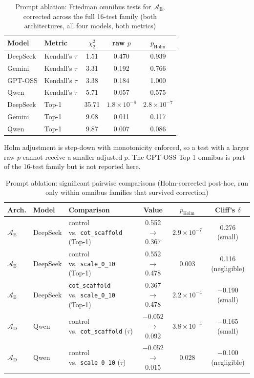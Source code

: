 \documentclass[11pt]{article}
\begin{document}
\begin{table}[htbp]
\centering
\small
\centering
\renewcommand{\arraystretch}{1.10}
\caption{Prompt ablation: Friedman omnibus tests for $\mathcal{A}_{\text{E}}$, corrected across the full 16-test family (both architectures, all four models, both metrics)}
\label{tab:prompt_friedman}
\begin{tabular}{@{}ll ccc@{}}
\toprule
Model & Metric & $\chi^2_2$ & raw $p$ & $p_{\text{Holm}}$ \\
\midrule
DeepSeek & Kendall's $\tau$ & 1.51 & 0.470 & 0.939 \\
Gemini & Kendall's $\tau$ & 3.31 & 0.192 & 0.766 \\
GPT-OSS & Kendall's $\tau$ & 3.38 & 0.184 & 1.000 \\
Qwen & Kendall's $\tau$ & 5.71 & 0.057 & 0.575 \\
DeepSeek & Top-1 & 35.71 & $1.8\times10^{-8}$ & $2.8\times10^{-7}$ \\
Gemini & Top-1 & 9.08 & 0.011 & 0.117 \\
Qwen & Top-1 & 9.87 & 0.007 & 0.086 \\
\bottomrule
\end{tabular}
\renewcommand{\arraystretch}{1.0}
\end{table}

Holm adjustment is step-down with monotonicity enforced, so a test with a larger raw $p$ cannot receive a smaller adjusted $p$. The GPT-OSS Top-1 omnibus is part of the 16-test family but is not reported here.

\begin{table}[htbp]
\centering
\small
\centering
\renewcommand{\arraystretch}{1.10}
\caption{Prompt ablation: significant pairwise comparisons (Holm-corrected post-hoc, run only within omnibus families that survived correction)}
\label{tab:prompt_pairwise}
\begin{tabular}{@{}ll l ccc@{}}
\toprule
Arch. & Model & Comparison & Value & $p_{\text{Holm}}$ & Cliff's $\delta$ \\
\midrule
$\mathcal{A}_{\text{E}}$ & DeepSeek & control vs.\ \texttt{cot\_scaffold} (Top-1) & 0.552 $\to$ 0.367 & $2.9\times10^{-7}$ & 0.276 (small) \\
$\mathcal{A}_{\text{E}}$ & DeepSeek & control vs.\ \texttt{scale\_0\_10} (Top-1) & 0.552 $\to$ 0.478 & 0.003 & 0.116 (negligible) \\
$\mathcal{A}_{\text{E}}$ & DeepSeek & \texttt{cot\_scaffold} vs.\ \texttt{scale\_0\_10} (Top-1) & 0.367 $\to$ 0.478 & $2.2\times10^{-4}$ & $-$0.190 (small) \\
$\mathcal{A}_{\text{D}}$ & Qwen & control vs.\ \texttt{cot\_scaffold} ($\tau$) & $-$0.052 $\to$ 0.092 & $3.8\times10^{-4}$ & $-$0.165 (small) \\
$\mathcal{A}_{\text{D}}$ & Qwen & control vs.\ \texttt{scale\_0\_10} ($\tau$) & $-$0.052 $\to$ 0.015 & 0.028 & $-$0.100 (negligible) \\
\bottomrule
\end{tabular}
\renewcommand{\arraystretch}{1.0}
\end{table}
\end{document}
